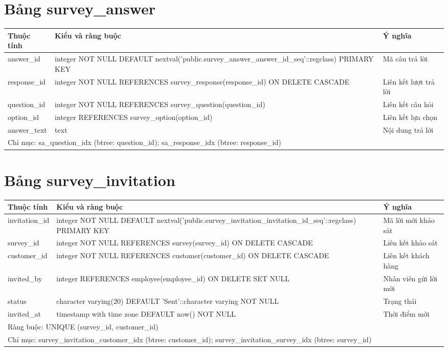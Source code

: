 \section{Bảng survey\_answer}
\begin{longtable}{|p{}|p{}|p{}|}\hline
\textbf{Thuộc tính}&\textbf{Kiểu và ràng buộc}&\textbf{Ý nghĩa}\\\hline\endhead
answer\_id & integer NOT NULL DEFAULT nextval('public.survey\_answer\_answer\_id\_seq'::regclass) PRIMARY KEY & Mã câu trả lời\\\hline
response\_id & integer NOT NULL REFERENCES survey\_response(response\_id) ON DELETE CASCADE & Liên kết lượt trả lời\\\hline
question\_id & integer NOT NULL REFERENCES survey\_question(question\_id) & Liên kết câu hỏi\\\hline
option\_id & integer REFERENCES survey\_option(option\_id) & Liên kết lựa chọn\\\hline
answer\_text & text & Nội dung trả lời\\\hline
\multicolumn{3}{|p{0.93\textwidth}|}{Chỉ mục: sa\_question\_idx (btree: question\_id); sa\_response\_idx (btree: response\_id)}\\\hline
\end{longtable}
\normalsize
\section{Bảng survey\_invitation}
\begin{longtable}{|p{}|p{}|p{}|}\hline
\textbf{Thuộc tính}&\textbf{Kiểu và ràng buộc}&\textbf{Ý nghĩa}\\\hline\endhead
invitation\_id & integer NOT NULL DEFAULT nextval('public.survey\_invitation\_invitation\_id\_seq'::regclass) PRIMARY KEY & Mã lời mời khảo sát\\\hline
survey\_id & integer NOT NULL REFERENCES survey(survey\_id) ON DELETE CASCADE & Liên kết khảo sát\\\hline
customer\_id & integer NOT NULL REFERENCES customer(customer\_id) ON DELETE CASCADE & Liên kết khách hàng\\\hline
invited\_by & integer REFERENCES employee(employee\_id) ON DELETE SET NULL & Nhân viên gửi lời mời\\\hline
status & character varying(20) DEFAULT 'Sent'::character varying NOT NULL & Trạng thái\\\hline
invited\_at & timestamp with time zone DEFAULT now() NOT NULL & Thời điểm mời\\\hline
\multicolumn{3}{|p{0.93\textwidth}|}{Ràng buộc: UNIQUE (survey\_id, customer\_id)}\\\hline
\multicolumn{3}{|p{0.93\textwidth}|}{Chỉ mục: survey\_invitation\_customer\_idx (btree: customer\_id); survey\_invitation\_survey\_idx (btree: survey\_id)}\\\hline
\end{longtable}
\normalsize
